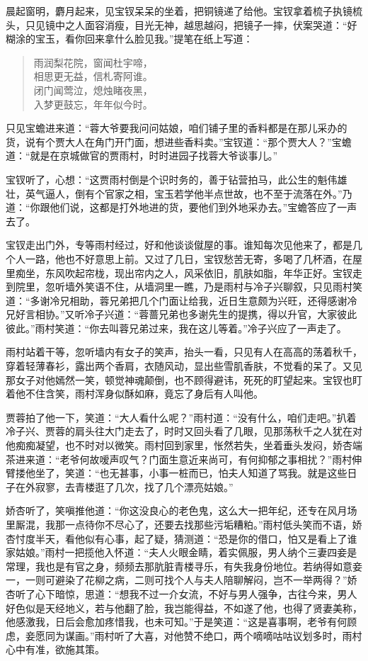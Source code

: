 \documentclass[12pt,oneside]{book}
\newenvironment{shici}{%
\begin{verse}%
\centering\large\hspace{12pt}}%
{\end{verse}}
\begin{document}
晨起窗明，麝月起来，见宝钗呆呆的坐着，把铜镜递了给他。宝钗拿着梳子执镜梳头，只见镜中之人面容消瘦，目光无神，越思越闷，把镜子一摔，伏案哭道：“好糊涂的宝玉，看你回来拿什么脸见我。”提笔在纸上写道：

\begin{shici}
雨润梨花院，窗闻杜宇啼，\\
相思更无益，信札寄阿谁。\\
闭门闻莺泣，熄烛睹夜黑，\\
入梦更鼓忘，年年似今时。
\end{shici}


只见宝蟾进来道：“蓉大爷要我问问姑娘，咱们铺子里的香料都是在那儿采办的货，说有个贾大人在角门开门面，想进些香料卖。”宝钗道：“那个贾大人？”宝蟾道：“就是在京城做官的贾雨村，时时进园子找蓉大爷谈事儿。”

宝钗听了，心想：“这贾雨村倒是个识时务的，善于钻营拍马，此公生的魁伟雄壮，英气逼人，倒有个官家之相，宝玉若学他半点世故，也不至于流落在外。”乃道：“你跟他们说，这都是打外地进的货，要他们到外地采办去。”宝蟾答应了一声去了。

宝钗走出门外，专等雨村经过，好和他谈谈僦屋的事。谁知每次见他来了，都是几个人一路，他也不好意思上前。又过了几日，宝钗愁苦无寄，多喝了几杯酒，在屋里痴坐，东风吹起帘栊，现出帘内之人，风采依旧，肌肤如脂，年华正好。宝钗走到院里，忽听墙外笑语不住，从墙洞里一瞧，乃是雨村与冷子兴聊叙，只见雨村笑道：“多谢冷兄相助，蓉兄弟把几个门面让给我，近日生意颇为兴旺，还得感谢冷兄好言相协。”又听冷子兴道：“蓉蔷兄弟也多谢先生的提携，得以升官，大家彼此彼此。”雨村笑道：“你去叫蓉兄弟过来，我在这儿等着。”冷子兴应了一声走了。

雨村站着干等，忽听墙内有女子的笑声，抬头一看，只见有人在高高的荡着秋千，穿着轻薄春衫，露出两个香肩，衣随风动，显出些雪肌香肤，不觉看的呆了。又见那女子对他嫣然一笑，顿觉神魂颠倒，也不顾得避讳，死死的盯望起来。宝钗也盯着他不住含笑，雨村浑身似酥如麻，竟忘了身后有人叫他。

贾蓉拍了他一下，笑道：“大人看什么呢？”雨村道：“没有什么，咱们走吧。”扒着冷子兴、贾蓉的肩头往大门走去了，时时又回头看了几眼，见那荡秋千之人犹在对他痴痴凝望，也不时对以微笑。雨村回到家里，怅然若失，坐着垂头发闷，娇杏端茶进来道：“老爷何故嗳声叹气？门面生意近来尚可，有何抑郁之事相扰？”雨村伸臂搂他坐了，笑道：“也无甚事，小事一桩而已，怕夫人知道了骂我。就是这些日子在外寂寥，去青楼逛了几次，找了几个漂亮姑娘。”

娇杏听了，笑嗔推他道：“你这没良心的老色鬼，这么大一把年纪，还专在风月场里厮混，我那一点待你不尽心了，还要去找那些污垢糟粕。”雨村低头笑而不语，娇杏忖度半天，看他似有心事，起了疑，猜测道：“恐是你的借口，怕又是看上了谁家姑娘。”雨村一把揽他入怀道：“夫人火眼金睛，着实佩服，男人纳个三妻四妾是常理，我也是有官之身，频频去那肮脏青楼寻乐，有失我身份地位。若纳得如意妾一，一则可避染了花柳之病，二则可找个人与夫人陪聊解闷，岂不一举两得？”娇杏听了心下暗惊，思道：“想我不过一介女流，不好与男人强争，古往今来，男人好色似是天经地义，若与他翻了脸，我岂能得益，不如遂了他，也得了贤妻美称，他感激我，日后会愈加疼惜我，也未可知。”于是笑道：“这是喜事啊，老爷有何顾虑，妾愿同为谋画。”雨村听了大喜，对他赞不绝口，两个嘀嘀咕咕议划多时，雨村心中有准，欲施其策。
\end{document}
